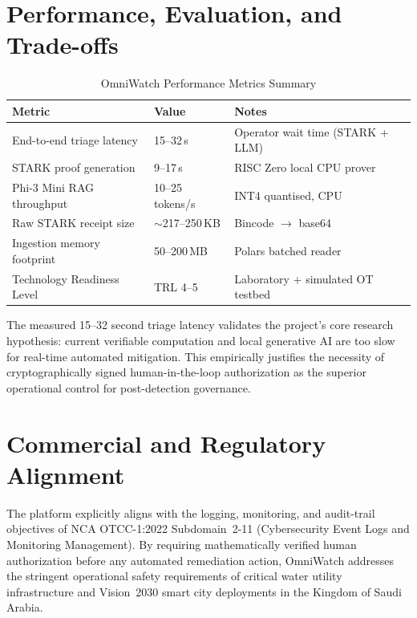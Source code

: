 \documentclass[12pt,a4paper]{article}
\begin{document}
\section{Performance, Evaluation, and Trade-offs}

\begin{table}[htbp]
\centering
\caption{OmniWatch Performance Metrics Summary}
\label{tab:perf}
\begin{tabular}{@{}lll@{}}
\toprule
\textbf{Metric} & \textbf{Value} & \textbf{Notes} \\
\midrule
End-to-end triage latency  & 15--32\,s & Operator wait time (STARK + LLM) \\
STARK proof generation     & 9--17\,s  & RISC Zero local CPU prover \\
Phi-3 Mini RAG throughput  & 10--25 tokens/s & INT4 quantised, CPU \\
Raw STARK receipt size     & $\sim$217--250\,KB & Bincode $\rightarrow$ base64 \\
Ingestion memory footprint & 50--200\,MB & Polars batched reader \\
Technology Readiness Level & TRL 4--5  & Laboratory + simulated OT testbed \\
\bottomrule
\end{tabular}
\end{table}

The measured 15--32 second triage latency validates the project's core
research hypothesis: current verifiable computation and local generative
AI are too slow for real-time automated mitigation. This empirically justifies
the necessity of cryptographically signed human-in-the-loop authorization
as the superior operational control for post-detection governance.

\section{Commercial and Regulatory Alignment}

The platform explicitly aligns with the logging, monitoring, and
audit-trail objectives of NCA OTCC-1:2022 Subdomain~2-11
(Cybersecurity Event Logs and Monitoring Management). By requiring
mathematically verified human authorization before any automated
remediation action, OmniWatch addresses the stringent operational safety
requirements of critical water utility infrastructure and Vision~2030
smart city deployments in the Kingdom of Saudi Arabia.
\end{document}
